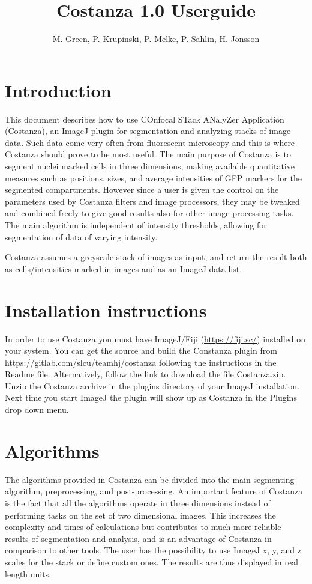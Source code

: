 \documentclass[a4paper,12pt]{article}
\title{Costanza 1.0 Userguide}
\author{M. Green, P. Krupinski, P. Melke, P. Sahlin, H. Jönsson}
\begin{document}
\maketitle


\section{Introduction}
This document describes how to use COnfocal STack ANalyZer Application
(Costanza), an ImageJ\cite{Abramoff2004} plugin for segmentation and analyzing
stacks of image data. Such data come very often from fluorescent microscopy and
this is where Costanza should prove to be most useful. The main purpose of
Costanza is to segment nuclei marked cells in three dimensions, making
available quantitative measures such as positions, sizes, and average
intensities of GFP markers for the segmented compartments. However since a user
is given the control on the parameters used by Costanza filters and image
processors, they may be tweaked and combined freely to give good results also
for other image processing tasks. The main algorithm is independent of
intensity thresholds, allowing for segmentation of data of varying intensity.

Costanza assumes a greyscale stack of images as input, and return the result
both as cells/intensities marked in images and as an ImageJ data list.

\section{Installation instructions}
%
In order to use Costanza you must have ImageJ/Fiji
(\url{https://fiji.sc/}) installed on your system. You can get the
source and build the Constanza plugin from
\url{https://gitlab.com/slcu/teamhj/costanza} following the
instructions in the Readme file. Alternatively, follow the link to download the
file Costanza.zip.
Unzip the Costanza archive in the plugins directory of your ImageJ
installation. Next time you start ImageJ the plugin will show up as Costanza
in the Plugins drop down menu.

\section{Algorithms}
%
The algorithms provided in Costanza can be divided into the main segmenting
algorithm, preprocessing, and post-processing. An important feature of
Costanza is the fact that all the algorithms operate in three dimensions
instead of performing tasks on the set of two dimensional images. This
increases the complexity and times of calculations but contributes to much
more reliable results of segmentation and analysis, and is an advantage of
Costanza in comparison to other tools. The user has the possibility to use
ImageJ x, y, and z scales for the stack or define custom ones. The results are
thus displayed in real length units.
\end{document}

